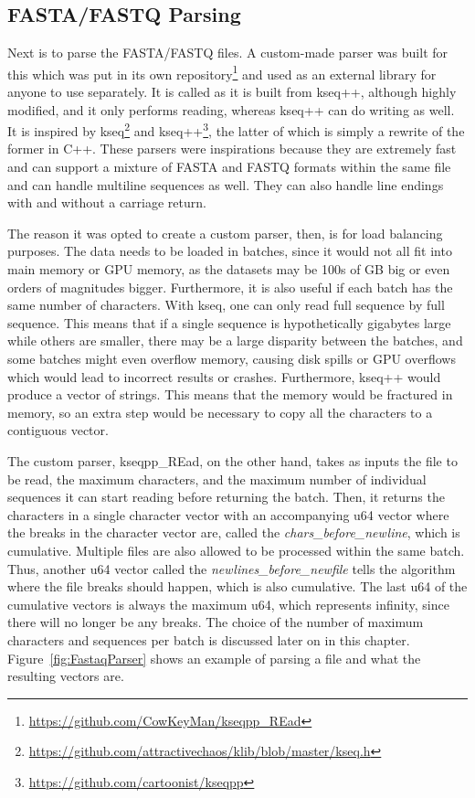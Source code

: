 \subsection{FASTA/FASTQ Parsing}

Next is to parse the FASTA/FASTQ files.
A custom-made parser was built for this which was put in its own repository\footnote{\url{https://github.com/CowKeyMan/kseqpp_REad}} and used as an external library for anyone to use separately.
It is called  as it is built from kseq++, although highly modified, and it only performs reading, whereas kseq++ can do writing as well.
It is inspired by kseq\footnote{\url{https://github.com/attractivechaos/klib/blob/master/kseq.h}} and kseq++\footnote{\url{https://github.com/cartoonist/kseqpp}}, the latter of which is simply a rewrite of the former in C++.
These parsers were inspirations because they are extremely fast and can support a mixture of FASTA and FASTQ formats within the same file and can handle multiline sequences as well.
They can also handle line endings with and without a carriage return.

The reason it was opted to create a custom parser, then, is for load balancing purposes.
The data needs to be loaded in batches, since it would not all fit into main memory or GPU memory, as the datasets may be 100s of GB big or even orders of magnitudes bigger.
Furthermore, it is also useful if each batch has the same number of characters.
With kseq, one can only read full sequence by full sequence.
This means that if a single sequence is hypothetically gigabytes large while others are smaller, there may be a large disparity between the batches, and some batches might even overflow memory, causing disk spills or GPU overflows which would lead to incorrect results or crashes.
Furthermore, kseq++ would produce a vector of strings.
This means that the memory would be fractured in memory, so an extra step would be necessary to copy all the characters to a contiguous vector.

The custom parser, kseqpp\_REad, on the other hand, takes as inputs the file to be read, the maximum characters, and the maximum number of individual sequences it can start reading before returning the batch.
Then, it returns the characters in a single character vector with an accompanying u64 vector where the breaks in the character vector are, called the \textit{chars\_before\_newline}, which is cumulative.
Multiple files are also allowed to be processed within the same batch.
Thus, another u64 vector called the \textit{newlines\_before\_newfile} tells the algorithm where the file breaks should happen, which is also cumulative.
The last u64 of the cumulative vectors is always the maximum u64, which represents infinity, since there will no longer be any breaks.
The choice of the number of maximum characters and sequences per batch is discussed later on in this chapter.
Figure~\ref{fig:FastaqParser} shows an example of parsing a file and what the resulting vectors are.

